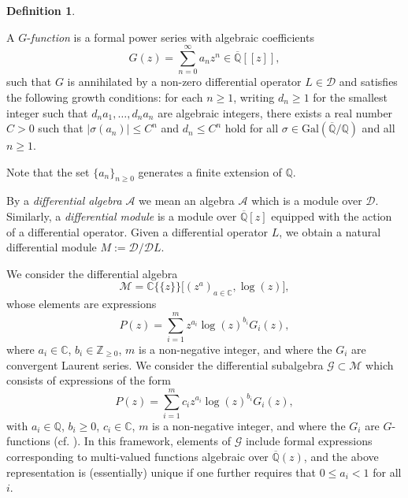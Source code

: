 \documentclass[10pt]{article}
\numberwithin{equation}{section}
\theoremstyle{plain}
\theoremstyle{definition}
\newtheorem{defn}[thm]{Definition}
\theoremstyle{remark}
\newcommand{\Qbar}{\overline{\mathbb{Q}}}
\begin{document}
\begin{defn}\label{defGfunc}

A $G$-\emph{function} is a formal power series with algebraic coefficients
\[
G(z)=\sum_{n=0}^{\infty} a_n z^n \in \overline{\mathbb{Q}}[[z]] ,
\]
such that $G$ is annihilated by a non-zero differential operator
\(L \in \mathcal{D}\)
and satisfies the following growth conditions: for each \(n \ge 1\),
writing \(d_n \ge 1\) for the smallest integer such that
\(d_n a_1, \ldots, d_n a_n\) are algebraic integers, there exists
a real number \(C>0\) such that \(|\sigma(a_n)| \le C^n\) and \(d_n \le C^n\)
hold for all \(\sigma \in \mathrm{Gal}(\overline{\mathbb{Q}}/\mathbb{Q})\)
and all \(n \ge 1\).
\end{defn}
\noindent Note that the set $\{ a_n \}_{n \geq 0}$ generates a finite extension of $\mathbb{Q}$.


By a \emph{differential algebra} $\mathcal{A}$ we mean an algebra $\mathcal{A}$ which is a module over $\mathcal{D}$. Similarly, a \emph{differential module} is a module over $\Qbar[z]$ equipped with the action of a differential operator. Given a differential operator $L$, we obtain a natural differential module $M := \mathcal{D} / \mathcal{D} L$.

We consider the differential algebra
\begin{equation}
\label{Meq}
    \mathcal{M} = \mathbb{C}\{\!\{z\}\!\}\big[(z^a)_{a\in\mathbb{C}}, \log(z)\big],
\end{equation}
whose elements are expressions
\begin{equation}
\label{Peq}
    P(z) = \sum_{i=1}^m z^{a_i}\log(z)^{b_i}G_i(z),
\end{equation}
where $a_i\in\mathbb{C}$, $b_i\in\mathbb{Z}_{\ge 0}$, $m$ is a non-negative integer, and where the $G_i$ are convergent Laurent series.
We consider the differential subalgebra $\mathcal{G} \subset \mathcal{M}$ which consists of expressions of the form
\begin{equation}
\label{Geq}
P(z) = \sum_{i=1}^m c_i z^{a_i}\log(z)^{b_i}G_i(z),
\end{equation}
with $a_i\in\mathbb{Q}$, $b_i\ge 0$, $c_i\in\mathbb{C}$, $m$ is a non-negative integer, and where the $G_i$ are $G$-functions (cf. ). In this framework, elements of $\mathcal{G}$ include formal expressions corresponding to multi-valued functions algebraic over $\overline{\mathbb{Q}}(z)$, and the above representation is (essentially) unique if one further requires that $0 \leq a_{i} < 1$ for all $i$.
\end{document}
